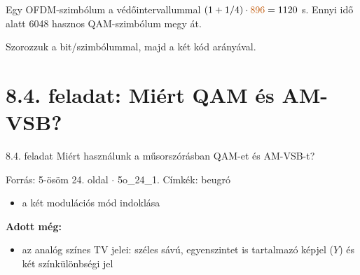 Egy OFDM-szimbólum a védőintervallummal $(1+1/4)\cdot{\cb{896}}=1120$ \textmu{}s. Ennyi idő alatt 6048 hasznos QAM-szimbólum megy át.

\begin{center}\end{center}

Szorozzuk a bit/szimbólummal, majd a két kód arányával.

\begin{center}\end{center}

\begin{center}\end{center}



\begin{center}\end{center}
\begin{eredmeny}

\begin{center}\end{center}
\end{eredmeny}


\section{\texorpdfstring{8.4. feladat: Miért QAM és AM-VSB?}{8.4. feladat: Miért QAM és AM-VSB?}}\label{o8_04}
\setcounter{lepes}{0}
\begin{feladat}{8.4. feladat}
Miért használunk a műsorszórásban QAM-et és AM-VSB-t?

{\footnotesize\sffamily Forrás: 5-ösöm 24. oldal $\cdot$ 5o\_24\_1. Címkék: beugró}
\end{feladat}
\begin{keresunk}
\begin{itemize}
\item a két modulációs mód indoklása
\end{itemize}
\end{keresunk}
\begin{jeloles}
\par\smallskip\textbf{Adott még:}
\begin{itemize}
\item az analóg színes TV jelei: széles sávú, egyenszintet is tartalmazó képjel ($Y$) és két színkülönbségi jel
\end{itemize}
\end{jeloles}


